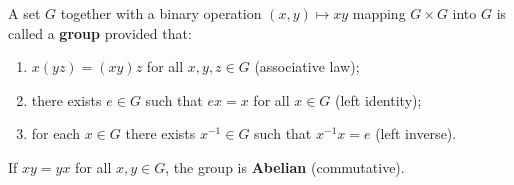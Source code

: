 A set \(G\) together with a binary operation \((x, y) \mapsto xy\) mapping \(G \times G\) into \(G\) is called a \textbf{group} provided that:
\begin{enumerate}
\item[(i)] \(x(yz) = (xy)z\) for all \(x, y, z \in G\) (associative law);
\item[(ii)] there exists \(e \in G\) such that \(ex = x\) for all \(x \in G\) (left identity);
\item[(iii)] for each \(x \in G\) there exists \(x^{-1} \in G\) such that \(x^{-1}x = e\) (left inverse).
\end{enumerate}
If \(xy = yx\) for all \(x, y \in G\), the group is \textbf{Abelian} (commutative).
